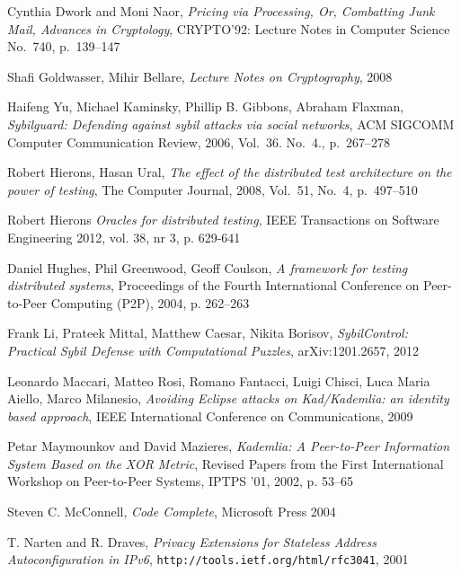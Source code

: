 \begin{thebibliography}{99}
  Cynthia Dwork and Moni Naor,
  \textit{Pricing via Processing, Or, Combatting Junk Mail, Advances in
  Cryptology},
  CRYPTO’92: Lecture Notes in Computer Science No.~740,
  p.~139--147



  Shafi Goldwasser, Mihir Bellare,
  \textit{Lecture Notes on Cryptography},
  2008


Haifeng Yu, Michael Kaminsky, Phillip B. Gibbons, Abraham Flaxman,
\textit{Sybilguard: Defending against sybil attacks via social networks},
ACM SIGCOMM Computer Communication Review,
2006,
Vol.~36. No.~4., p.~267--278

  Robert Hierons, Hasan Ural,
  \textit{The effect of the distributed test architecture on the power of testing},
  The Computer Journal, 2008, Vol.~51, No.~4, p.~497--510

  Robert Hierons
  \textit{Oracles for distributed testing},
  IEEE Transactions on Software Engineering 2012, vol. 38, nr 3, p. 629-641

  Daniel Hughes, Phil Greenwood, Geoff Coulson,
  \textit{A framework for testing distributed systems},
  Proceedings of the Fourth International Conference on Peer-to-Peer Computing
  (P2P), 
  2004, p. 262--263

Frank Li, Prateek Mittal, Matthew Caesar, Nikita Borisov,
\textit{SybilControl: Practical Sybil Defense with Computational Puzzles},
arXiv:1201.2657, 2012

  Leonardo Maccari, Matteo Rosi, Romano Fantacci, Luigi Chisci, Luca Maria
  Aiello, Marco Milanesio,
  \textit{Avoiding Eclipse attacks on Kad/Kademlia: an identity based approach},
   IEEE International Conference on Communications, 2009

  Petar Maymounkov and David Mazieres,
  \textit{Kademlia: A Peer-to-Peer Information System Based on the XOR Metric},
  Revised Papers from the First International Workshop on Peer-to-Peer Systems,
  IPTPS '01, 2002, p. 53--65

  Steven C. McConnell,
  \textit{Code Complete},
  Microsoft Press 2004

  T. Narten and R. Draves,
  \textit{Privacy Extensions for Stateless Address Autoconfiguration in IPv6},
  \texttt{http://tools.ietf.org/html/rfc3041},
  2001


\end{thebibliography}

